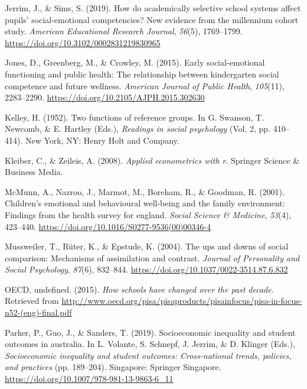 \documentclass[
  english,
  man]{apa6}
\newlength{\cslhangindent}
\newenvironment{cslreferences}%
  {\setlength{\parindent}{0pt}%
  \everypar{\setlength{\hangindent}{\cslhangindent}}\ignorespaces}%
  {\par}
\begin{document}
\begin{cslreferences}
\leavevmode\hypertarget{ref-jerrim2019}{}%
Jerrim, J., \& Sims, S. (2019). How do academically selective school systems affect pupils' social-emotional competencies? New evidence from the millennium cohort study. \emph{American Educational Research Journal}, \emph{56}(5), 1769--1799. \url{https://doi.org/10.3102/0002831219830965}

\leavevmode\hypertarget{ref-jones2015}{}%
Jones, D., Greenberg, M., \& Crowley, M. (2015). Early social-emotional functioning and public health: The relationship between kindergarten social competence and future wellness. \emph{American Journal of Public Health}, \emph{105}(11), 2283--2290. \url{https://doi.org/10.2105/AJPH.2015.302630}

\leavevmode\hypertarget{ref-kelley1952}{}%
Kelley, H. (1952). Two functions of reference groups. In G. Swanson, T. Newcomb, \& E. Hartley (Eds.), \emph{Readings in social psychology} (Vol. 2, pp. 410--414). New York, NY: Henry Holt and Company.

\leavevmode\hypertarget{ref-kleiber2008}{}%
Kleiber, C., \& Zeileis, A. (2008). \emph{Applied econometrics with r}. Springer Science \& Business Media.

\leavevmode\hypertarget{ref-mcmunn2001}{}%
McMunn, A., Nazroo, J., Marmot, M., Boreham, R., \& Goodman, R. (2001). Children's emotional and behavioural well-being and the family environment: Findings from the health survey for england. \emph{Social Science \& Medicine}, \emph{53}(4), 423--440. \url{https://doi.org/10.1016/S0277-9536(00)00346-4}

\leavevmode\hypertarget{ref-mussweiler2004}{}%
Mussweiler, T., Rüter, K., \& Epstude, K. (2004). The ups and downs of social comparison: Mechanisms of assimilation and contrast. \emph{Journal of Personality and Social Psychology}, \emph{87}(6), 832--844. \url{https://doi.org/10.1037/0022-3514.87.6.832}

\leavevmode\hypertarget{ref-oecd2015}{}%
OECD, undefined. (2015). \emph{How schools have changed over the past decade}. Retrieved from \url{http://www.oecd.org/pisa/pisaproducts/pisainfocus/pisa-in-focus-n52-(eng)-final.pdf}

\leavevmode\hypertarget{ref-parker2019}{}%
Parker, P., Guo, J., \& Sanders, T. (2019). Socioeconomic inequality and student outcomes in australia. In L. Volante, S. Schnepf, J. Jerrim, \& D. Klinger (Eds.), \emph{Socioeconomic inequality and student outcomes: Cross-national trends, policies, and practices} (pp. 189--204). Singapore: Springer Singapore. \url{https://doi.org/10.1007/978-981-13-9863-6_11}


\end{cslreferences}
\end{document}
